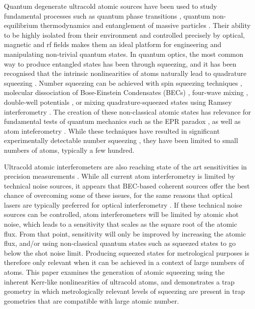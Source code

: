 \documentclass{iopart}
\begin{document}
Quantum degenerate ultracold atomic sources have been used to study fundamental processes such as quantum phase transitions \cite{Leggett2001,Buluta2009}, quantum non-equilibrium thermodynamics \cite{Kinoshita:2006,Barnett:2011} and entanglement of massive particles \cite{Kheruntsyan:2005}.  Their ability to be highly isolated from their environment and controlled precisely by optical, magnetic and rf fields makes them an ideal platform for engineering and manipulating non-trivial quantum states.   In quantum optics, the most common way to produce entangled states has been through squeezing, and it has been recognised that the intrinsic nonlinearities of atoms naturally lead to quadrature squeezing \cite{kheruntsyanET2005, johnssonET2007, haineET2009, doeringET2010}.  Number squeezing can be achieved with spin squeezing techniques \cite{kitagawaET1993, gross2010, sinatra2012}, molecular dissociation of Bose-Einstein Condensates (BECs) \cite{kheruntsyanET2002, davisET2008, savage2007, ogren2010}, four-wave mixing \cite{perrin2008, ogren2009, jascula2010}, double-well potentials \cite{esteve2008, maussang2010}, or mixing quadrature-squeezed states using Ramsey interferometry \cite{haineET2009}.
The creation of these non-classical atomic states has relevance for fundamental tests of quantum mechanics such as the EPR paradox \cite{pu2000, sorensen2001, haine2005,zhao2007, ogren2010}, as well as atom inteferometry \cite{sorensenET1999, kuzmichET2000, meyerET2001, liebfriedET2004, roosET2006, doeringET2010, gross2010}.
While these techniques have resulted in significant experimentally detectable number squeezing \cite{gross2010}, they have been limited to small numbers of atoms, typically a few hundred. 

Ultracold atomic interferometers are also reaching state of the art sensitivities in precision measurements \cite{Robins2012}. While all current atom interferometry is limited by technical noise sources, it appears that BEC-based coherent sources offer the best chance of overcoming some of these issues, for the same reasons that optical lasers are typically preferred for optical interferometry \cite{Szigeti2012}.  If these technical noise sources can be controlled, atom interferometers will be limited by atomic shot noise, which leads to a sensitivity that scales as the square root of the atomic flux.   From that point, sensitivity will only be improved by increasing the atomic flux, and/or using non-classical quantum states such as squeezed states to go below the shot noise limit.  Producing squeezed states for metrological purposes is therefore only relevant when it can be achieved in a context of large numbers of atoms.  This paper examines the generation of atomic squeezing using the inherent Kerr-like nonlinearities of ultracold atoms, and demonstrates a trap geometry in which metrologically relevant levels of squeezing are present in trap geometries that are compatible with large atomic number.
\end{document}

